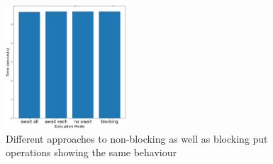 \begin{figure}
    \centering
    \includegraphics[width=0.4\textwidth]{img/blocking_nonblocking_barchart.png}
    \caption{Different approaches to non-blocking as well as blocking put operations showing the same behaviour}
    \label{fig:block_nonblock}
\end{figure}
